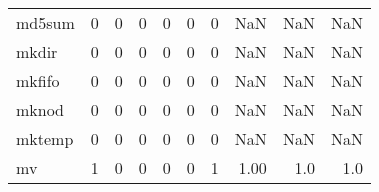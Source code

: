 \begin{longtable}{lrrrrrrrrr}
md5sum    &                                       0 &                                                  0 &                                                  0 &                                                  0 &                                                  0 &                                                  0 &                                                NaN &                                    NaN &                                  NaN \\
mkdir     &                                       0 &                                                  0 &                                                  0 &                                                  0 &                                                  0 &                                                  0 &                                                NaN &                                    NaN &                                  NaN \\
mkfifo    &                                       0 &                                                  0 &                                                  0 &                                                  0 &                                                  0 &                                                  0 &                                                NaN &                                    NaN &                                  NaN \\
mknod     &                                       0 &                                                  0 &                                                  0 &                                                  0 &                                                  0 &                                                  0 &                                                NaN &                                    NaN &                                  NaN \\
mktemp    &                                       0 &                                                  0 &                                                  0 &                                                  0 &                                                  0 &                                                  0 &                                                NaN &                                    NaN &                                  NaN \\
mv        &                                       1 &                                                  0 &                                                  0 &                                                  0 &                                                  0 &                                                  1 &                                               1.00 &                                    1.0 &                                  1.0 \\

\end{longtable}
